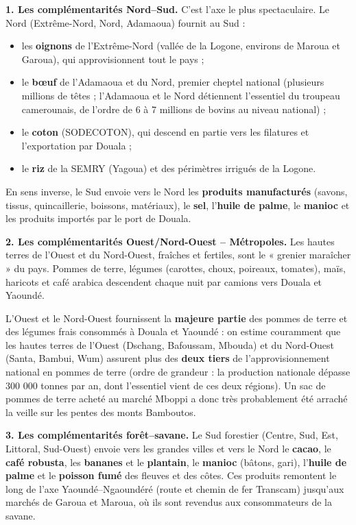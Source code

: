 \documentclass[11pt]{article}
\begin{document}
\textbf{1. Les complémentarités Nord--Sud.} C'est l'axe le plus spectaculaire. Le Nord (Extrême-Nord, Nord, Adamaoua) fournit au Sud :
\begin{itemize}
\item les \textbf{oignons} de l'Extrême-Nord (vallée de la Logone, environs de Maroua et Garoua), qui approvisionnent tout le pays ;
\item le \textbf{bœuf} de l'Adamaoua et du Nord, premier cheptel national (plusieurs millions de têtes ; l'Adamaoua et le Nord détiennent l'essentiel du troupeau camerounais, de l'ordre de 6 à 7 millions de bovins au niveau national) ;
\item le \textbf{coton} (SODECOTON), qui descend en partie vers les filatures et l'exportation par Douala ;
\item le \textbf{riz} de la SEMRY (Yagoua) et des périmètres irrigués de la Logone.
\end{itemize}
En sens inverse, le Sud envoie vers le Nord les \textbf{produits manufacturés} (savons, tissus, quincaillerie, boissons, matériaux), le \textbf{sel}, l'\textbf{huile de palme}, le \textbf{manioc} et les produits importés par le port de Douala.

\textbf{2. Les complémentarités Ouest/Nord-Ouest -- Métropoles.} Les hautes terres de l'Ouest et du Nord-Ouest, fraîches et fertiles, sont le « grenier maraîcher » du pays. Pommes de terre, légumes (carottes, choux, poireaux, tomates), maïs, haricots et café arabica descendent chaque nuit par camions vers Douala et Yaoundé.

\begin{exemplebox}
L'Ouest et le Nord-Ouest fournissent la \textbf{majeure partie} des pommes de terre et des légumes frais consommés à Douala et Yaoundé : on estime couramment que les hautes terres de l'Ouest (Dschang, Bafoussam, Mbouda) et du Nord-Ouest (Santa, Bambui, Wum) assurent plus des \textbf{deux tiers} de l'approvisionnement national en pommes de terre (ordre de grandeur : la production nationale dépasse 300 000 tonnes par an, dont l'essentiel vient de ces deux régions). Un sac de pommes de terre acheté au marché Mboppi a donc très probablement été arraché la veille sur les pentes des monts Bamboutos.
\end{exemplebox}

\textbf{3. Les complémentarités forêt--savane.} Le Sud forestier (Centre, Sud, Est, Littoral, Sud-Ouest) envoie vers les grandes villes et vers le Nord le \textbf{cacao}, le \textbf{café robusta}, les \textbf{bananes} et le \textbf{plantain}, le \textbf{manioc} (bâtons, gari), l'\textbf{huile de palme} et le \textbf{poisson fumé} des fleuves et des côtes. Ces produits remontent le long de l'axe Yaoundé--Ngaoundéré (route et chemin de fer Transcam) jusqu'aux marchés de Garoua et Maroua, où ils sont revendus aux consommateurs de la savane.
\end{document}
